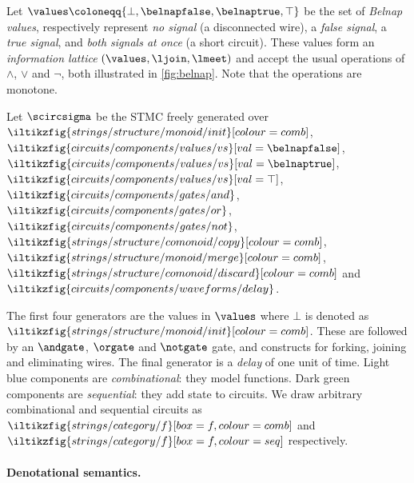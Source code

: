 \documentclass[10pt]{article}
\begin{document}
\begin{definition}
    Let \(\values \coloneqq \{\bot,\belnapfalse,\belnaptrue,\top\}\) be the set
    of \emph{Belnap values}, respectively represent \emph{no signal}
    (a disconnected wire), a \emph{false signal}, a \emph{true signal}, and
    \emph{both signals at once} (a short circuit).
    These values form an \emph{information lattice} \((\values,\ljoin,\lmeet)\)
    and accept the usual operations of \(\land\), \(\lor\) and \(\neg\), both
    illustrated in \cref{fig:belnap}.
    Note that the operations are monotone.
\end{definition}

\begin{definition}
    Let \(\scircsigma\) be the STMC freely generated over \(
    \iltikzfig{strings/structure/monoid/init}[colour=comb]
    \), \(
    \iltikzfig{circuits/components/values/vs}[val=\belnapfalse]
    \), \(
    \iltikzfig{circuits/components/values/vs}[val=\belnaptrue]
    \), \(
    \iltikzfig{circuits/components/values/vs}[val=\top]
    \), \(
    \iltikzfig{circuits/components/gates/and}
    \), \(
    \iltikzfig{circuits/components/gates/or}
    \), \(
    \iltikzfig{circuits/components/gates/not}
    \), \(
    \iltikzfig{strings/structure/comonoid/copy}[colour=comb]
    \), \(
    \iltikzfig{strings/structure/monoid/merge}[colour=comb]
    \), \(
    \iltikzfig{strings/structure/comonoid/discard}[colour=comb]
    \) and \(
    \iltikzfig{circuits/components/waveforms/delay}
    \).
\end{definition}

The first four generators are the values in \(\values\) where \(\bot\)
is denoted as \(\iltikzfig{strings/structure/monoid/init}[colour=comb]\).
These are followed by an \(\andgate\), \(\orgate\) and \(\notgate\) gate, and
constructs for forking, joining and eliminating wires.
The final generator is a \emph{delay} of one unit of time.
Light blue components are \emph{combinational}: they model functions.
Dark green components are \emph{sequential}: they add state to circuits.
We draw arbitrary combinational and sequential circuits as \(
\iltikzfig{strings/category/f}[box=f,colour=comb]
\) and \(
\iltikzfig{strings/category/f}[box=f,colour=seq]
\) respectively.

\paragraph*{Denotational semantics.}
\end{document}
